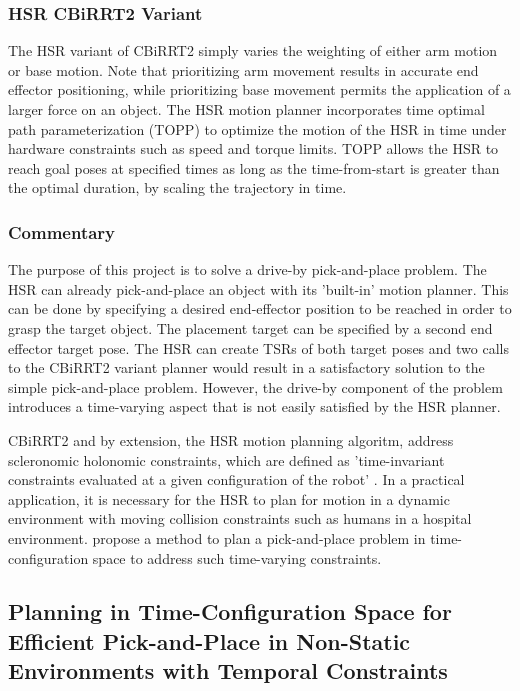 \documentclass[12pt]{article}
\begin{document}
        \subsubsection{HSR CBiRRT2 Variant}
            The HSR variant of CBiRRT2 simply varies the weighting of either arm motion or base motion. \cite{yamamoto_development_2019} Note that prioritizing arm movement results in accurate end effector positioning, while prioritizing base movement permits the application of a larger force on an object. The HSR motion planner incorporates time optimal path parameterization (TOPP)\cite{yamamoto_development_2019} to optimize the motion of the HSR in time under hardware constraints such as speed and torque limits. TOPP allows the HSR to reach goal poses at specified times as long as the time-from-start is greater than the optimal duration, by scaling the trajectory in time.

        \subsubsection{Commentary}
            The purpose of this project is to solve a drive-by pick-and-place problem. The HSR can already pick-and-place an object with its 'built-in' motion planner. This can be done by specifying a desired end-effector position to be reached in order to grasp the target object. The placement target can be specified by a second end effector target pose. The HSR can create TSRs of both target poses and two calls to the CBiRRT2 variant planner would result in a satisfactory solution to the simple pick-and-place problem. However, the drive-by component of the problem introduces a time-varying aspect that is not easily satisfied by the HSR planner.

            \par CBiRRT2 and by extension, the HSR motion planning algoritm, address scleronomic holonomic constraints, which are defined as 'time-invariant constraints evaluated at a given configuration of the robot' \cite{berenson_pose-constrained_2009}. In a practical application, it is necessary for the HSR to plan for motion in a dynamic environment with moving collision constraints such as humans in a hospital environment. \cite{yang_planning_2018} propose a method to plan a pick-and-place problem in time-configuration space to address such time-varying constraints.

    \subsection{Planning in Time-Configuration Space for Efficient Pick-and-Place in Non-Static Environments with Temporal Constraints}
\end{document}
